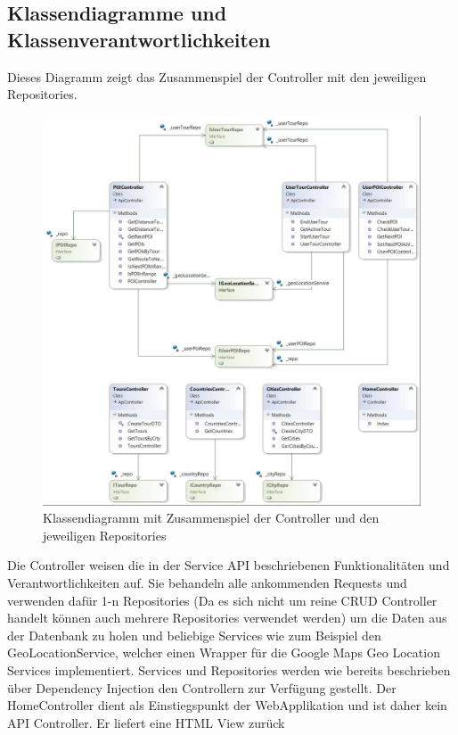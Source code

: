 \documentclass[a4paper,10pt,xetex]{article}
\begin{document}
\subsection{Klassendiagramme und Klassenverantwortlichkeiten}\label{klassendiagramme}
Dieses Diagramm zeigt das Zusammenspiel der Controller mit den jeweiligen Repositories.

\begin{figure}
  \centering
  \includegraphics{klassendiagramm_backend1}
  \caption{Klassendiagramm mit Zusammenspiel der Controller und den jeweiligen Repositories}
\end{figure}

Die Controller weisen die in der Service API beschriebenen Funktionalit\"aten und Verantwortlichkeiten auf. Sie
behandeln alle ankommenden Requests und verwenden daf\"ur 1-n Repositories (Da es sich nicht um reine CRUD Controller
handelt k\"onnen auch mehrere Repositories verwendet werden) um die Daten aus der Datenbank zu holen und beliebige
Services wie zum Beispiel den GeoLocationService, welcher einen Wrapper f\"ur die Google Maps Geo Location Services
implementiert. Services und Repositories werden wie bereits beschrieben \"uber Dependency Injection den Controllern zur
Verf\"ugung gestellt. Der HomeController dient als Einstiegspunkt der WebApplikation und ist daher kein API Controller.
Er liefert eine HTML View zur\"uck
\end{document}
